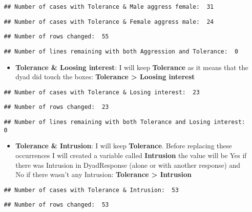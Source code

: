 \documentclass[
]{article}
\providecommand{\tightlist}{%
  \setlength{\itemsep}{0pt}\setlength{\parskip}{0pt}}
\begin{document}
\begin{verbatim}
## Number of cases with Tolerance & Male aggress female:  31
\end{verbatim}

\begin{verbatim}
## Number of cases with Tolerance & Female aggress male:  24
\end{verbatim}

\begin{verbatim}
## Number of rows changed:  55
\end{verbatim}

\begin{verbatim}
## Number of lines remaining with both Aggression and Tolerance:  0
\end{verbatim}

\begin{itemize}
\tightlist
\item
  \textbf{Tolerance \& Loosing interest}: I will keep \textbf{Tolerance}
  as it means that the dyad did touch the boxes: \textbf{Tolerance
  \textgreater{} Loosing interest}
\end{itemize}

\begin{verbatim}
## Number of cases with Tolerance & Losing interest:  23
\end{verbatim}

\begin{verbatim}
## Number of rows changed:  23
\end{verbatim}

\begin{verbatim}
## Number of lines remaining with both Tolerance and Losing interest:  0
\end{verbatim}

\begin{itemize}
\tightlist
\item
  \textbf{Tolerance \& Intrusion}: I will keep \textbf{Tolerance}.
  Before replacing these occurrences I will created a variable called
  \textbf{Intrusion} the value will be Yes if there was Intrusion in
  DyadResponse (alone or with another response) and No if there wasn't
  any Intrusion: \textbf{Tolerance \textgreater{} Intrusion}
\end{itemize}

\begin{verbatim}
## Number of cases with Tolerance & Intrusion:  53
\end{verbatim}

\begin{verbatim}
## Number of rows changed:  53
\end{verbatim}
\end{document}

